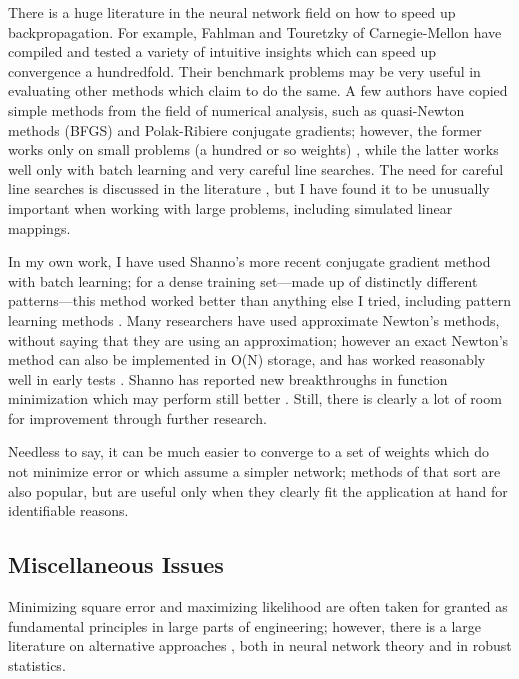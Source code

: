 \documentclass[journal]{IEEEtran} %
\begin{document}
There is a huge literature in the neural network field on how to speed up backpropagation. For example, Fahlman and Touretzky of Carnegie-Mellon have compiled and tested a variety of intuitive insights which can speed up convergence a hundredfold. Their benchmark problems may be very useful in evaluating other methods which claim to do the same. A few authors have copied simple methods from the field of numerical analysis, such as quasi-Newton methods (BFGS) and Polak-Ribiere conjugate gradients; however, the former works only on small problems (a hundred or so weights) \cite{Dennis:1983}, while the latter works well only with batch learning and very careful line searches. The need for careful line searches is discussed in the literature \cite{Shanno:1978}, but I have found it to be unusually important when working with large problems, including simulated linear mappings.

In my own work, I have used Shanno's more recent conjugate gradient method with batch learning; for a dense training set---made up of distinctly different patterns---this method worked better than anything else I tried, including pattern learning methods \cite{Werbos:1988}. Many researchers have used approximate Newton's methods, without saying that they are using an approximation; however an exact Newton's method can also be implemented in O(N) storage, and has worked reasonably well in early tests \cite{Werbos:1988}. Shanno has reported new breakthroughs in function minimization which may perform still better \cite{Shanno:1990}. Still, there is clearly a lot of room for improvement through further research.

Needless to say, it can be much easier to converge to a set of weights which do not minimize error or which assume a simpler network; methods of that sort are also popular, but are useful only when they clearly fit the application at hand for identifiable reasons.

\subsection{Miscellaneous Issues}
Minimizing square error and maximizing likelihood are often taken for granted as fundamental principles in large parts of engineering; however, there is a large literature on alternative approaches \cite{Werbos:1988}, both in neural network theory and in robust statistics.
\end{document}
